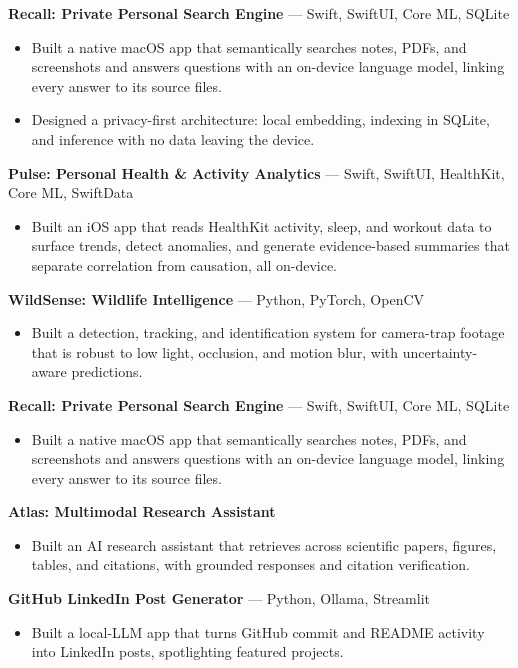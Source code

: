 \documentclass[a4paper,8pt]{extarticle}
\makeatletter
\newcommand{\v}[2]{%
  \edef\@vtmp{,\variant,}%
  \expandafter\in@\expandafter{\@vtmp}{,#1,}%
  \ifin@ #2\fi}
\makeatother
\begin{document}
\v{apple}{%
\noindent
\textbf{Recall: Private Personal Search Engine} --- Swift, SwiftUI, Core ML, SQLite
\begin{itemize}
\item Built a native macOS app that semantically searches notes, PDFs, and screenshots and answers questions with an on-device language model, linking every answer to its source files.
\item Designed a privacy-first architecture: local embedding, indexing in SQLite, and inference with no data leaving the device.
\end{itemize}
\noindent
\textbf{Pulse: Personal Health \& Activity Analytics} --- Swift, SwiftUI, HealthKit, Core ML, SwiftData
\begin{itemize}
\item Built an iOS app that reads HealthKit activity, sleep, and workout data to surface trends, detect anomalies, and generate evidence-based summaries that separate correlation from causation, all on-device.
\end{itemize}
\noindent
\textbf{WildSense: Wildlife Intelligence} --- Python, PyTorch, OpenCV
\begin{itemize}
\item Built a detection, tracking, and identification system for camera-trap footage that is robust to low light, occlusion, and motion blur, with uncertainty-aware predictions.
\end{itemize}
}

\v{genai}{%
\noindent
\textbf{Recall: Private Personal Search Engine} --- Swift, SwiftUI, Core ML, SQLite
\begin{itemize}
\item Built a native macOS app that semantically searches notes, PDFs, and screenshots and answers questions with an on-device language model, linking every answer to its source files.
\end{itemize}
\noindent
\textbf{Atlas: Multimodal Research Assistant}
\begin{itemize}
\item Built an AI research assistant that retrieves across scientific papers, figures, tables, and citations, with grounded responses and citation verification.
\end{itemize}
\noindent
\textbf{GitHub LinkedIn Post Generator} --- Python, Ollama, Streamlit
\begin{itemize}
\item Built a local-LLM app that turns GitHub commit and README activity into LinkedIn posts, spotlighting featured projects.
\end{itemize}
}
\end{document}
